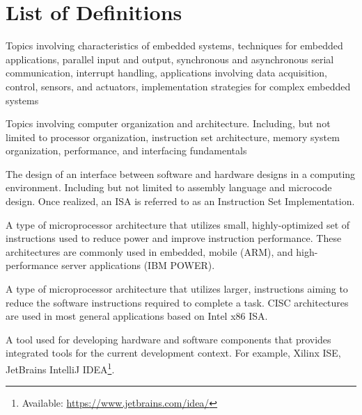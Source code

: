 
\chapter*{List of Definitions}

\begin{definition} 
	Topics involving characteristics of embedded systems, techniques for embedded applications, parallel input and output, synchronous and asynchronous serial communication, interrupt handling, applications involving data acquisition, control, sensors, and actuators, implementation strategies for complex embedded systems \cite[p.~118]{cec2016}
\end{definition}

\begin{definition} 
	Topics involving computer organization and architecture. Including, but not limited to processor organization, instruction set architecture, memory system organization, performance, and interfacing fundamentals\cite[p.~118]{cec2016}
\end{definition}

\begin{definition}
    The design of an interface between software and hardware designs in a computing environment. Including but not limited to assembly language and microcode design. Once realized, an ISA is referred to as an Instruction Set Implementation. 
\end{definition}

\begin{definition}
    A type of microprocessor architecture that utilizes small, highly-optimized set of instructions used to reduce power and improve instruction performance\cite{Aletan1992, Stokes1999}. These architectures are commonly used in embedded, mobile (ARM), and high-performance server applications (IBM POWER). 
\end{definition}

\begin{definition}
    A type of microprocessor architecture that utilizes larger, instructions aiming to reduce the software instructions required to complete a task\cite{Aletan1992, Stokes1999}. CISC architectures are used in most general applications based on Intel\textregistered{} x86 ISA\cite{intel2017}.
\end{definition}

\begin{definition}
    A tool used for developing hardware and software components that provides integrated tools for the current development context. For example, Xilinx ISE\cite{xilinxISE}, JetBrains IntelliJ IDEA\footnote{Available: \url{https://www.jetbrains.com/idea/}}.
\end{definition}

